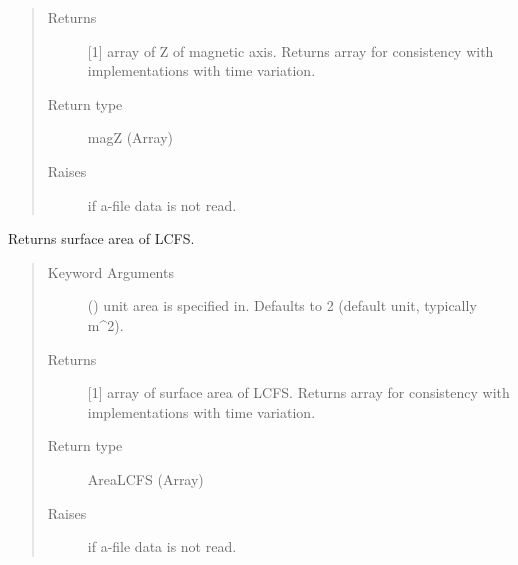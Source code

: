 \documentclass[letterpaper,10pt,english]{sphinxmanual}
\begin{document}
\begin{fulllineitems}
\begin{fulllineitems}
\begin{quote}
\begin{description}
\item[{Returns}] \leavevmode
{[}1{]} array of Z of magnetic axis.  Returns array for
consistency with
{\hyperref[\detokenize{eqtools:eqtools.core.Equilibrium}]{}}
implementations with time variation.

\item[{Return type}] \leavevmode
magZ (Array)

\item[{Raises}] \leavevmode
{} \textendash{} if a-file data is not read.

\end{description}\end{quote}

\end{fulllineitems}


\begin{fulllineitems}
\label{\detokenize{eqtools:eqtools.eqdskreader.EqdskReader.getAreaLCFS}}
Returns surface area of LCFS.
\begin{quote}\begin{description}
\item[{Keyword Arguments}] \leavevmode
{} () \textendash{} unit area is specified in.  Defaults to 2
(default unit, typically m\textasciicircum{}2).

\item[{Returns}] \leavevmode
{[}1{]} array of surface area of LCFS.  Returns array
for consistency with
{\hyperref[\detokenize{eqtools:eqtools.core.Equilibrium}]{}}
implementations with time variation.

\item[{Return type}] \leavevmode
AreaLCFS (Array)

\item[{Raises}] \leavevmode
{} \textendash{} if a-file data is not read.

\end{description}\end{quote}


\end{fulllineitems}
\end{fulllineitems}
\end{document}
